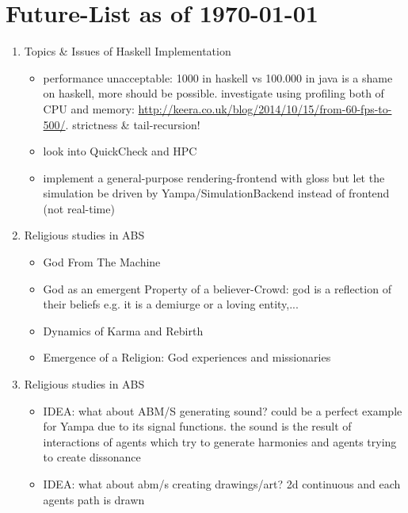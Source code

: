 \section{Future-List as of \today}
\begin{enumerate}
\item Topics \& Issues of Haskell Implementation
	\begin{itemize}
		\item performance unacceptable: 1000 in haskell vs 100.000 in java is a shame on haskell, more should be possible. investigate using profiling both of CPU and memory: \url{http://keera.co.uk/blog/2014/10/15/from-60-fps-to-500/}. strictness \& tail-recursion!	
		\item look into QuickCheck and HPC
		\item implement a general-purpose rendering-frontend with gloss but let the simulation be driven by Yampa/SimulationBackend instead of frontend (not real-time)
	\end{itemize}
	
\item Religious studies in ABS
	\begin{itemize}
		\item God From The Machine
		\item God as an emergent Property of a believer-Crowd: god is a reflection of their beliefs e.g. it is a demiurge or a loving entity,...
		\item Dynamics of Karma and Rebirth
		\item Emergence of a Religion: God experiences and missionaries
	\end{itemize}
	
	\item Religious studies in ABS
	\begin{itemize}
			\item IDEA: what about ABM/S generating sound? could be a perfect example for Yampa due to its signal functions. the sound is the result of interactions of agents which try to generate harmonies and agents trying to create dissonance
		\item IDEA: what about abm/s creating drawings/art? 2d continuous and each agents path is drawn
	\end{itemize}
\end{enumerate} 
